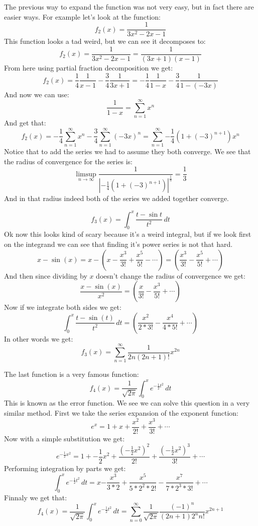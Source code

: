 \documentclass[11pt,a4paper]{article}
\begin{document}
	\newpage
	
	The previous way to expand the function was not very easy, but in fact
	there are easier ways. For example let's look at the function:
	\[
		f_2(x) = \frac{1}{3x^2-2x-1}
	\]
	This function looks a tad weird, but we can see it decomposes to:
	\[
		f_2(x) = \frac{1}{3x^2-2x-1} = \frac{1}{(3x+1)(x-1)}
	\]
	From here using partial fraction decomposition we get:
	\[
		f_2(x) = \frac 14 \frac{1}{x-1} - \frac 34 \frac{1}{3x+1} =
		-\frac 14 \frac{1}{1-x} - \frac 34 \frac{1}{1-(-3x)}
	\]
	And now we can use:
	\[
		\frac{1}{1-x} = \sum_{n=1}^{\infty}{x^n}
	\]
	And get that:
	\[
		f_2(x) = 
		- \frac 14 \sum_{n=1}^{\infty}{x^n}
		- \frac 34 \sum_{n=1}^{\infty}{(-3x)^n} = 
		\sum_{n=1}^{\infty}{-\frac 14 (1+(-3)^{n+1}) x^n}
	\]
	Notice that to add the series we had to assume they both converge.
	We see that the radius of convergence for the series is:
	\[
		\limsup_{n\to\infty}
		{\frac{1}{\left|-\frac 14 (1+(-3)^{n+1})\right|^{\frac 1n}}} = 
		\frac 13
	\]
	And in that radius indeed both of the series we added together converge.
	
	\newpage
	
	\[
		f_3(x) = \int_{0}^{x}{\frac{t-\sin t}{t^2}\,dt}
	\]
	Ok now this looks kind of scary because it's a weird integral, but
	if we look first on the integrand we can see that finding it's
	power series is not that hard.
	\[
		x - \sin(x) = 
		x - \left(x - \frac{x^3}{3!} + \frac{x^5}{5!} - \cdots \right) = 
		\left(\frac{x^3}{3!} - \frac{x^5}{5!} + \cdots \right)
	\]
	And then since dividing by $x$ doesn't change the radius of convergence
	we get:
	\[
		\frac{x - \sin(x)}{x^2} = 
		\left(\frac{x}{3!} - \frac{x^3}{5!} + \cdots \right)
	\]
	Now if we integrate both sides we get:
	\[
		\int_{0}^{x}{\frac{t - \sin(t)}{t^2}\,dt} = 
		\left(\frac{x^2}{2*3!} - \frac{x^4}{4*5!} + \cdots \right)
	\]
	In other words we get:
	\[
		f_3(x) = \sum_{n=1}^{\infty}{\frac{1}{2n(2n+1)!}x^{2n}}
	\]
	
	\newpage
	
	The last function is a very famous function:
	\[
		f_4(x) = 
		\frac{1}{\sqrt{2\pi}}\int_{0}^{x}{e^{-\frac{1}{2}t^2}\,dt}
	\]
	This is known as the error function. We see we can solve this question
	in a very similar method. First we take the series expansion of the
	exponent function:
	\[
		e^x = 1 + x + \frac{x^2}{2!} + \frac{x^3}{3!} + \cdots
	\]
	Now with a simple substitution we get:
	\[
		e^{-\frac{1}{2}x^2} = 
		1 + {-\frac{1}{2}x^2} + \frac{(-\frac{1}{2}x^2)^2}{2!} + 
		\frac{(-\frac{1}{2}x^2)^3}{3!} + \cdots
	\]
	Performing integration by parts we get:
	\[
		\int_{0}^{x}{e^{-\frac{1}{2}t^2}\,dt} = 
		x
		{-\frac{x^3}{3*2}} + 
		\frac{x^5}{5*2^2*2!} - 
		\frac{x^7}{7*2^3*3!} + \cdots
	\]
	Finnaly we get that:
	\[
		f_4(x) = 
		\frac{1}{\sqrt{2\pi}}\int_{0}^{x}{e^{-\frac{1}{2}t^2}\,dt} = 
		\sum_{n=0}^{\infty}{
		\frac{1}{\sqrt{2\pi}}
		\frac{(-1)^n}{(2n+1) 2^n n!}x^{2n+1}}
	\]
	
\end{document}
